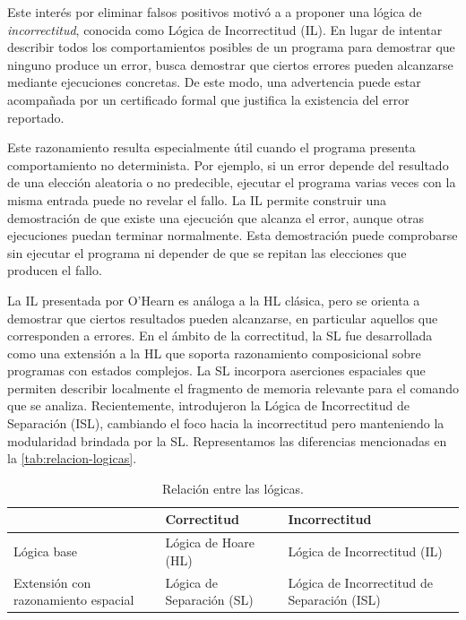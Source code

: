 \documentclass[a4paper,	11pt]{report}
\newif\ifdraft\drafttrue
\newcommand{\comm}[3]{\ifdraft{{\color{#1}[#2: #3]}}\fi}
\newcommand{\guido}[1]{\comm{blue}{Guido}{#1}}
\begin{document}
Este interés por eliminar falsos positivos
motivó a \citet{inclog} a proponer una lógica de \emph{incorrectitud},
conocida como Lógica de Incorrectitud (IL).
En lugar de intentar describir todos los comportamientos posibles de un programa
para demostrar que ninguno produce un error,
busca demostrar que ciertos errores pueden alcanzarse mediante ejecuciones concretas.
De este modo, una advertencia puede estar acompañada por un certificado formal
que justifica la existencia del error reportado.

Este razonamiento resulta especialmente útil cuando el programa presenta comportamiento no determinista.
Por ejemplo, si un error depende del resultado de una elección aleatoria o no predecible,
ejecutar el programa varias veces con la misma entrada puede no revelar el fallo.
La IL permite construir una demostración de que existe una ejecución que alcanza el error,
aunque otras ejecuciones puedan terminar normalmente.
Esta demostración puede comprobarse sin ejecutar el programa ni depender de que se repitan las elecciones que producen el fallo.

La IL presentada por O'Hearn es análoga a la HL clásica,
pero se orienta a demostrar que ciertos resultados pueden alcanzarse,
en particular aquellos que corresponden a errores.
En el ámbito de la correctitud,
la SL fue desarrollada como una extensión a la HL que soporta razonamiento composicional sobre programas con estados complejos.
La SL incorpora aserciones espaciales que permiten describir localmente el fragmento de memoria relevante para el comando que se analiza.
Recientemente, \citet{isl} introdujeron la Lógica de Incorrectitud de Separación (ISL),
cambiando el foco hacia la incorrectitud pero manteniendo la modularidad brindada por la SL.
Representamos las diferencias mencionadas en la \autoref{tab:relacion-logicas}.
\begin{table}[h]
\centering
\small
\begin{tabularx}{\textwidth}{
    >{\centering\arraybackslash}X
  | >{\centering\arraybackslash}X
  | >{\centering\arraybackslash}X
}
   & \textbf{Correctitud} & \textbf{Incorrectitud} \\
  \hline
  Lógica base & Lógica de Hoare (HL) & Lógica de Incorrectitud (IL) \\
  \hline
  Extensión con razonamiento espacial & Lógica de Separación (SL) & Lógica de Incorrectitud de Separación (ISL) \\
\end{tabularx}
\caption{Relación entre las lógicas.}
\label{tab:relacion-logicas}
\end{table}
\end{document}

